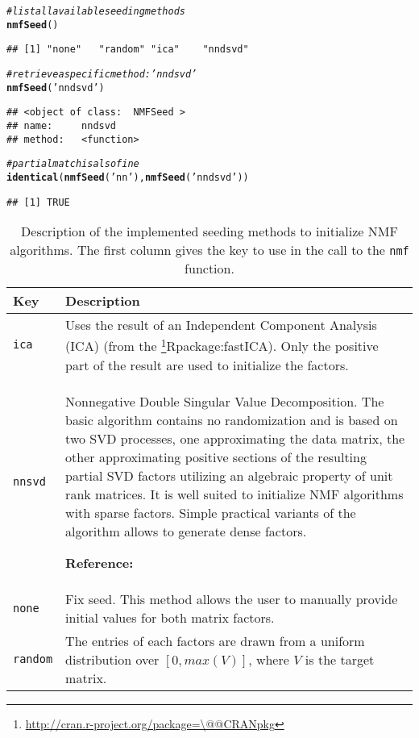 \documentclass[a4paper]{article}\usepackage[]{graphicx}\usepackage[]{color}
\makeatletter
\newcommand{\hlstr}[1]{\textcolor[rgb]{0.192,0.494,0.8}{#1}}%
\newcommand{\hlcom}[1]{\textcolor[rgb]{0.678,0.584,0.686}{\textit{#1}}}%
\newcommand{\hlstd}[1]{\textcolor[rgb]{0.345,0.345,0.345}{#1}}%
\newcommand{\hlkwd}[1]{\textcolor[rgb]{0.737,0.353,0.396}{\textbf{#1}}}%
\newenvironment{kframe}{%
 \def\at@end@of@kframe{}%
 \ifinner\ifhmode%
  \def\at@end@of@kframe{\end{minipage}}%
  \begin{minipage}{\columnwidth}%
 \fi\fi%
 \def\FrameCommand##1{\hskip\@totalleftmargin \hskip-\fboxsep
 \colorbox{shadecolor}{##1}\hskip-\fboxsep
     \hskip-\linewidth \hskip-\@totalleftmargin \hskip\columnwidth}%
 \MakeFramed {\advance\hsize-\width
   \@totalleftmargin\z@ \linewidth\hsize
   \@setminipage}}%
 {\par\unskip\endMakeFramed%
 \at@end@of@kframe}
\newenvironment{knitrout}{}{} %
\let\code=\texttt
\newcommand{\pkgname}[1]{\textit{#1}\xspace}
\newcommand{\CRANurl}[1]{\url{http://cran.r-project.org/package=#1}}
\def\CRANpkg{\@ifstar\@CRANpkg\@@CRANpkg}
\def\@CRANpkg#1{\href{http://cran.r-project.org/package=#1}{\pkgname{#1}}\footnote{\CRANurl{#1}}}
\def\@@CRANpkg#1{\href{http://cran.r-project.org/package=#1}{\pkgname{#1}} package\footnote{\CRANurl{#1}}}
\def\citeCRANpkg{\@ifstar\@citeCRANpkg\@@citeCRANpkg}
\def\@citeCRANpkg#1{\CRANpkg{#1}\cite*{Rpackage:#1}}
\def\@@citeCRANpkg#1{\CRANpkg{#1}~\cite{Rpackage:#1}}
\renewcommand{\cite}[1]{\parencite{#1}}
\makeatother
\begin{document}
\begin{knitrout}
\color{fgcolor}\begin{kframe}
\begin{alltt}
\hlcom{# list all available seeding methods}
\hlkwd{nmfSeed}\hlstd{()}
\end{alltt}
\begin{verbatim}
## [1] "none"   "random" "ica"    "nndsvd"
\end{verbatim}
\begin{alltt}
\hlcom{# retrieve a specific method: 'nndsvd' }
\hlkwd{nmfSeed}\hlstd{(}\hlstr{'nndsvd'}\hlstd{)}
\end{alltt}
\begin{verbatim}
## <object of class:  NMFSeed >
## name:	 nndsvd 
## method:	 <function>
\end{verbatim}
\begin{alltt}
\hlcom{# partial match is also fine}
\hlkwd{identical}\hlstd{(}\hlkwd{nmfSeed}\hlstd{(}\hlstr{'nn'}\hlstd{),} \hlkwd{nmfSeed}\hlstd{(}\hlstr{'nndsvd'}\hlstd{))}
\end{alltt}
\begin{verbatim}
## [1] TRUE
\end{verbatim}
\end{kframe}
\end{knitrout}

\begin{table}[h!t]
\begin{tabularx}{\textwidth}{lX}
\hline
Key & Description\\
\hline
\code{ica} & Uses the result of an Independent Component Analysis (ICA) (from
the \citeCRANpkg{fastICA}).
Only the positive part of the result are used to initialize the factors.\\
\hline
%
\code{nnsvd} & Nonnegative Double Singular Value Decomposition.
The basic algorithm contains no randomization and is based on two SVD processes, one approximating the data matrix, the other approximating positive sections of the resulting partial SVD factors utilizing an algebraic property of unit rank matrices. 
It is well suited to initialize NMF algorithms with sparse factors. Simple practical variants of the algorithm allows to generate dense factors.

\textbf{Reference:} \cite{Boutsidis2008}\\
\hline
%
\code{none} & Fix seed.
This method allows the user to manually provide initial values for both matrix factors.\\ 
\hline
%
\code{random} & The entries of each factors are drawn from a uniform distribution over $[0, max(V)]$, where $V$ is the target matrix.\\
\hline
\end{tabularx}
\caption{Description of the implemented seeding methods to initialize NMF algorithms.
The first column gives the key to use in the call to the \texttt{nmf} function.\label{tab:seed}}
\end{table}
\end{document}
